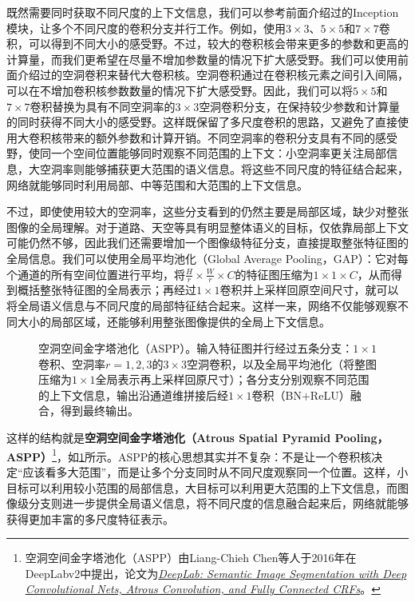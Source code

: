 既然需要同时获取不同尺度的上下文信息，我们可以参考前面介绍过的Inception模块，让多个不同尺度的卷积分支并行工作。例如，使用$3\times3$、$5\times5$和$7\times7$卷积，可以得到不同大小的感受野。不过，较大的卷积核会带来更多的参数和更高的计算量，而我们更希望在尽量不增加参数量的情况下扩大感受野。我们可以使用前面介绍过的空洞卷积来替代大卷积核。空洞卷积通过在卷积核元素之间引入间隔，可以在不增加卷积核参数数量的情况下扩大感受野。因此，我们可以将$5\times5$和$7\times7$卷积替换为具有不同空洞率的$3\times3$空洞卷积分支，在保持较少参数和计算量的同时获得不同大小的感受野。这样既保留了多尺度卷积的思路，又避免了直接使用大卷积核带来的额外参数和计算开销。不同空洞率的卷积分支具有不同的感受野，使同一个空间位置能够同时观察不同范围的上下文：小空洞率更关注局部信息，大空洞率则能够捕获更大范围的语义信息。将这些不同尺度的特征结合起来，网络就能够同时利用局部、中等范围和大范围的上下文信息。

不过，即使使用较大的空洞率，这些分支看到的仍然主要是局部区域，缺少对整张图像的全局理解。对于道路、天空等具有明显整体语义的目标，仅依靠局部上下文可能仍然不够，因此我们还需要增加一个图像级特征分支，直接提取整张特征图的全局信息。我们可以使用全局平均池化（Global Average Pooling，GAP）：它对每个通道的所有空间位置进行平均，将$\frac{H}{r}\times\frac{W}{r}\times C$的特征图压缩为$1\times1\times C$，从而得到概括整张特征图的全局表示；再经过$1\times1$卷积并上采样回原空间尺寸，就可以将全局语义信息与不同尺度的局部特征结合起来。这样一来，网络不仅能够观察不同大小的局部区域，还能够利用整张图像提供的全局上下文信息。

\begin{figure}[H]
    \caption{空洞空间金字塔池化（ASPP）。输入特征图并行经过五条分支：$1\times 1$卷积、空洞率$r=1,2,3$的$3\times 3$空洞卷积，以及全局平均池化（将整图压缩为$1\times 1$全局表示再上采样回原尺寸）；各分支分别观察不同范围的上下文信息，输出沿通道维拼接后经$1\times 1$卷积（BN+ReLU）融合，得到最终输出。}
    \label{fig:aspp}
\end{figure}

这样的结构就是\textbf{空洞空间金字塔池化（Atrous Spatial Pyramid Pooling，ASPP）}\footnote{空洞空间金字塔池化（ASPP）由Liang-Chieh Chen等人于2016年在DeepLabv2中提出，论文为\href{https://arxiv.org/abs/1606.00915}{\textit{DeepLab: Semantic Image Segmentation with Deep Convolutional Nets, Atrous Convolution, and Fully Connected CRFs}}。}，如\cref{fig:aspp}所示。ASPP的核心思想其实并不复杂：不是让一个卷积核决定“应该看多大范围”，而是让多个分支同时从不同尺度观察同一个位置。这样，小目标可以利用较小范围的局部信息，大目标可以利用更大范围的上下文信息，而图像级分支则进一步提供全局语义信息，将不同尺度的信息融合起来后，网络就能够获得更加丰富的多尺度特征表示。

